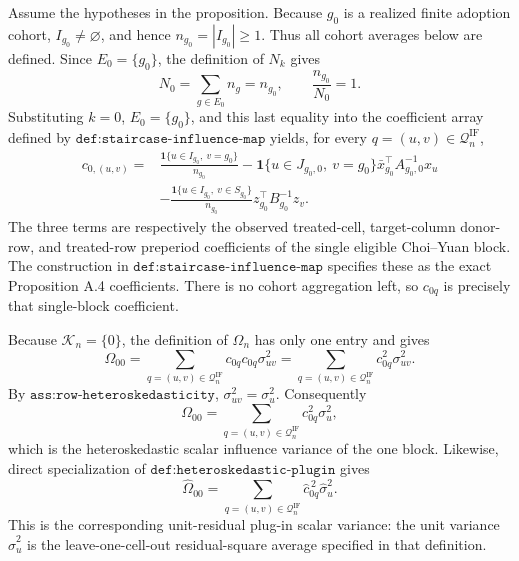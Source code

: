 Assume the hypotheses in the proposition.  Because \(g_0\) is a realized
finite adoption cohort, \(I_{g_0}\neq\varnothing\), and hence
\(n_{g_0}=|I_{g_0}|\geq 1\).  Thus all cohort averages below are defined.
Since \(E_0=\{g_0\}\), the definition of \(N_k\) gives
\[
N_0=\sum_{g\in E_0}n_g=n_{g_0},
\qquad
\frac{n_{g_0}}{N_0}=1.
\]
Substituting \(k=0\), \(E_0=\{g_0\}\), and this last equality into the
coefficient array defined by \(\texttt{def:staircase-influence-map}\) yields,
for every \(q=(u,v)\in\mathcal Q_n^{\mathrm{IF}}\),
\[
\begin{aligned}
c_{0,(u,v)}
={}&\frac{\mathbf 1\{u\in I_{g_0},\ v=g_0\}}{n_{g_0}}
-\mathbf 1\{u\in J_{g_0,0},\ v=g_0\}
  \bar x_{g_0}^{\top}A_{g_0,0}^{-1}x_u \\
&-\frac{\mathbf 1\{u\in I_{g_0},\ v\in S_{g_0}\}}{n_{g_0}}
  z_{g_0}^{\top}B_{g_0}^{-1}z_v .
\end{aligned}
\]
The three terms are respectively the observed treated-cell, target-column
donor-row, and treated-row preperiod coefficients of the single eligible
Choi--Yuan block.  The construction in
\(\texttt{def:staircase-influence-map}\) specifies these as the exact
Proposition A.4 coefficients.  There is no cohort aggregation left, so
\(c_{0q}\) is precisely that single-block coefficient.

Because \(\mathcal K_n=\{0\}\), the definition of \(\Omega_n\) has only one
entry and gives
\[
\Omega_{00}
=\sum_{q=(u,v)\in\mathcal Q_n^{\mathrm{IF}}}
  c_{0q}c_{0q}\sigma_{uv}^{2}
=\sum_{q=(u,v)\in\mathcal Q_n^{\mathrm{IF}}}
  c_{0q}^{2}\sigma_{uv}^{2}.
\]
By \(\texttt{ass:row-heteroskedasticity}\),
\(\sigma_{uv}^{2}=\sigma_u^{2}\).  Consequently
\[
\Omega_{00}
=\sum_{q=(u,v)\in\mathcal Q_n^{\mathrm{IF}}}c_{0q}^{2}\sigma_u^{2},
\]
which is the heteroskedastic scalar influence variance of the one block.
Likewise, direct specialization of
\(\texttt{def:heteroskedastic-plugin}\) gives
\[
\widehat\Omega_{00}
=\sum_{q=(u,v)\in\mathcal Q_n^{\mathrm{IF}}}
  \widehat c_{0q}^{\,2}\widehat\sigma_u^{2}.
\]
This is the corresponding unit-residual plug-in scalar variance: the unit
variance \(\widehat\sigma_u^2\) is the leave-one-cell-out residual-square
average specified in that definition.

